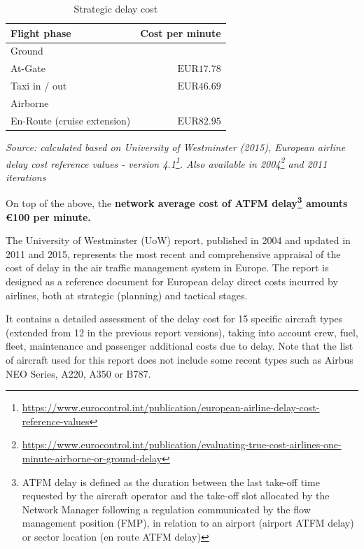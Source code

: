 \documentclass[
  11pt,
  a4paper,
]{book}
\DeclareRobustCommand{\href}[2]{#2\footnote{\url{#1}}}
\begin{document}
\hypertarget{tbl-delay-cost-strat}{}
\setlength{\LTpost}{0mm}
\begin{longtable}{lr}
\caption{\label{tbl-delay-cost-strat}Strategic delay cost }\tabularnewline

\toprule
\textbf{Flight phase} & \textbf{Cost per minute} \\ 
\midrule
\multicolumn{2}{l}{Ground} \\ 
\midrule
At-Gate & $\text{EUR}17.78$ \\ 
Taxi in / out & $\text{EUR}46.69$ \\ 
\midrule
\multicolumn{2}{l}{Airborne} \\ 
En-Route (cruise extension) & $\text{EUR}82.95$ \\ 
\bottomrule
\end{longtable}
\begin{minipage}{\linewidth}
\emph{Source: calculated based on \href{https://www.eurocontrol.int/publication/european-airline-delay-cost-reference-values}{University of Westminster (2015), European airline delay cost reference values - version 4.1}. Also available in \href{https://www.eurocontrol.int/publication/evaluating-true-cost-airlines-one-minute-airborne-or-ground-delay}{2004} and 2011 iterations}\\
\end{minipage}

On top of the above, the \textbf{network average cost of ATFM
delay\footnote{ATFM delay is defined as the duration between the last
  take-off time requested by the aircraft operator and the take-off slot
  allocated by the Network Manager following a regulation communicated
  by the flow management position (FMP), in relation to an airport
  (airport ATFM delay) or sector location (en route ATFM delay)} amounts
€100 per minute.}

The University of Westminster (UoW) report, published in 2004 and
updated in 2011 and 2015, represents the most recent and comprehensive
appraisal of the cost of delay in the air traffic management system in
Europe. The report is designed as a reference document for European
delay direct costs incurred by airlines, both at strategic (planning)
and tactical stages.

It contains a detailed assessment of the delay cost for 15 specific
aircraft types (extended from 12 in the previous report versions),
taking into account crew, fuel, fleet, maintenance and passenger
additional costs due to delay. Note that the list of aircraft used for
this report does not include some recent types such as Airbus NEO
Series, A220, A350 or B787.
\end{document}
